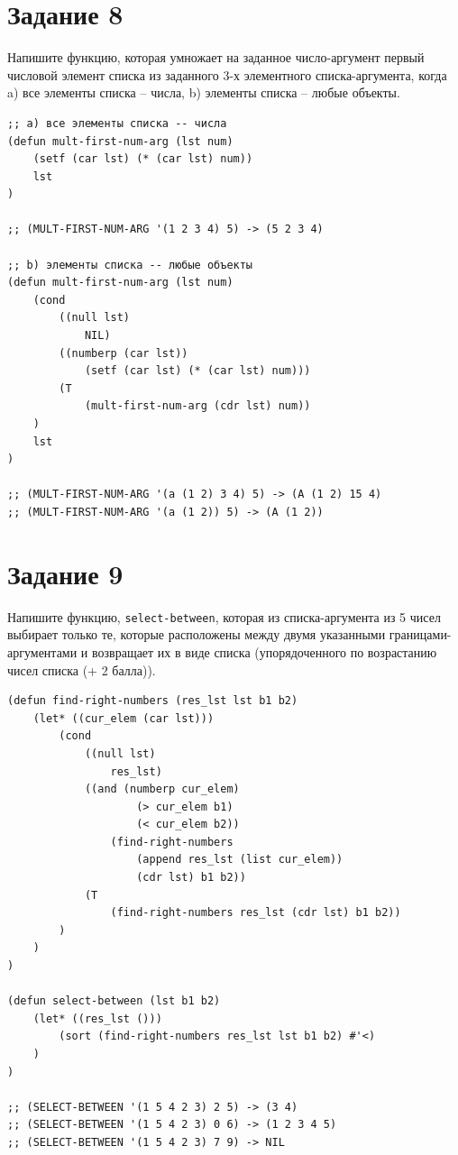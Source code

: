 \documentclass[a4paper,14pt, unknownkeysallowed]{extreport}
\begin{document}
\section{Задание 8}

Напишите функцию, которая умножает на заданное число-аргумент первый числовой элемент списка из заданного 3-х элементного списка-аргумента, когда a) все элементы списка -- числа, b) элементы списка -- любые объекты.

\begin{center}
\captionsetup{justification=raggedright,singlelinecheck=off}
\begin{lstlisting}[label=lst:parallel_processing,caption=Решение задания 8]
;; a) все элементы списка -- числа
(defun mult-first-num-arg (lst num)
	(setf (car lst) (* (car lst) num))
	lst
)

;; (MULT-FIRST-NUM-ARG '(1 2 3 4) 5) -> (5 2 3 4)

;; b) элементы списка -- любые объекты
(defun mult-first-num-arg (lst num)
	(cond 
		((null lst)
			NIL)
		((numberp (car lst)) 
			(setf (car lst) (* (car lst) num)))
		(T 
			(mult-first-num-arg (cdr lst) num))
	)
	lst
)

;; (MULT-FIRST-NUM-ARG '(a (1 2) 3 4) 5) -> (A (1 2) 15 4)
;; (MULT-FIRST-NUM-ARG '(a (1 2)) 5) -> (A (1 2))
\end{lstlisting}
\end{center}

\clearpage

\section{Задание 9}

Напишите функцию, \texttt{select-between}, которая из списка-аргумента из 5 чисел выбирает только те, которые расположены между двумя указанными границами-аргументами и возвращает их в виде списка (упорядоченного по возрастанию чисел списка (+ 2 балла)).

\begin{center}
\captionsetup{justification=raggedright,singlelinecheck=off}
\begin{lstlisting}[label=lst:parallel_processing,caption=Решение задания 9]
(defun find-right-numbers (res_lst lst b1 b2)
    (let* ((cur_elem (car lst)))
        (cond
            ((null lst)
                res_lst)
            ((and (numberp cur_elem) 
                    (> cur_elem b1)
                    (< cur_elem b2))
                (find-right-numbers 
                    (append res_lst (list cur_elem))
                    (cdr lst) b1 b2))
            (T 
                (find-right-numbers res_lst (cdr lst) b1 b2))
        )
    )
)

(defun select-between (lst b1 b2)
    (let* ((res_lst ()))
        (sort (find-right-numbers res_lst lst b1 b2) #'<)
    )
)

;; (SELECT-BETWEEN '(1 5 4 2 3) 2 5) -> (3 4)
;; (SELECT-BETWEEN '(1 5 4 2 3) 0 6) -> (1 2 3 4 5)
;; (SELECT-BETWEEN '(1 5 4 2 3) 7 9) -> NIL
\end{lstlisting}
\end{center}
\end{document}

